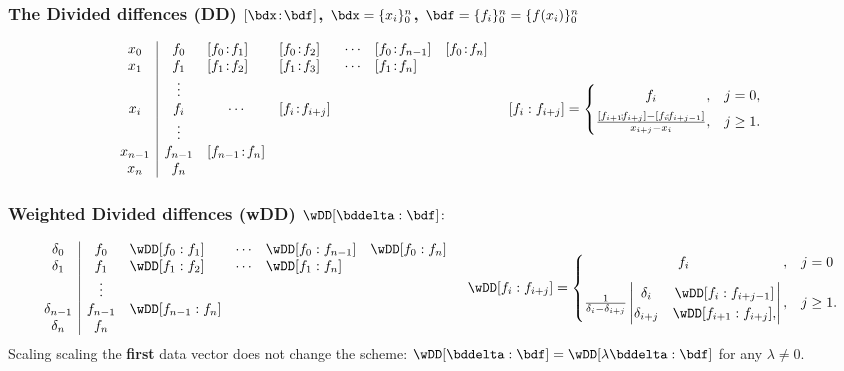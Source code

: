 \documentclass[a4paper]{article}
\begin{document}
\subsubsection*{The Divided diffences (DD) $[\bdx\!:\!\bdf]$, $\bdx=\{x_i\}_0^n$, $\bdf=\{f_i\}_0^n=\{f(x_i)\}_0^n$} %

{\footnotesize
\[
  \begin{array}[m]{c|c*{6}{l}}
    x_0 & {f_0}
        & {[f_0\!:\!f_1]}
        & {[f_0\!:\!f_2]}
        & \cdots
        & {[f_0\!:\!f_{n-1}]}
        & {[f_0\!:\!f_{n}]} \\
    x_1 & f_1 & [f_1\!:\!f_2] & [f_1\!:\!f_3]
        & \hfill\cdots & [f_1\!:\!f_{n}] \\
        & \vdots & \\
    x_i & f_i & \hfil\cdots &  [f_i\!:\!f_{i+j}]\\
        &   \vdots & \\
    x_{n-1} & f_{n-1} & [f_{n-1}\!:\!f_n] \\
    x_{n}   & f_{n} \\
  \end{array}
  \quad
      [f_i:f_{i+j}]
      =
      \begin{cases}
       \hfill f_i\hfill , & j=0, \\[4pt]
        \frac{[f_{i+1}\!:\!f_{i+j}]-[f_i\!:\!f_{i+j-1}]}{x_{i+j}-x_i},
        & j \ge 1.
      \end{cases}
\]
}


\subsubsection*{Weighted Divided diffences (wDD) $\wDD[\bddelta:\bdf]\!:$} %
{\footnotesize
\[
  \begin{array}[m]{c|c*{5}{l}}
    \delta_0 & {f_0}
             & {\wDD[f_0:f_1]}
             & \cdots
             & {\wDD[f_0:f_{n-1}]}
             & {\wDD[f_0:f_{n}]} \\
    \delta_1 & f_1 & \wDD[f_1:f_2]
                 & \cdots & \wDD[f_1:f_{n}] \\
                 & \vdots & \\
    \delta_{n-1} & f_{n-1} & \wDD[f_{n-1}:f_n] \\
    \delta_{n}   & f_{n} \\
  \end{array}
  \quad
\begin{aligned}
  \wDD[f_i:f_{i+j}]
  =
  \begin{cases}
    \hfill f_i\hfill , & j=0
    \\[7pt]
  \frac{1}{\delta_i - \delta_{i+j}}
  \begin{vmatrix}
   \delta_i     & \wDD[f_i:f_{i+j-1}] \\
   \delta_{i+j} & \wDD[f_{i+1}:f_{i+j}],
  \end{vmatrix},
    & j \ge 1.
  \end{cases}
\end{aligned}
\]
}
Scaling scaling the \textbf{first} data vector does not change the scheme:
$
  \wDD[\bddelta:\bdf]
  =\wDD[\lambda\bddelta:\bdf]
$ for any $\lambda\neq0$.
\end{document}
